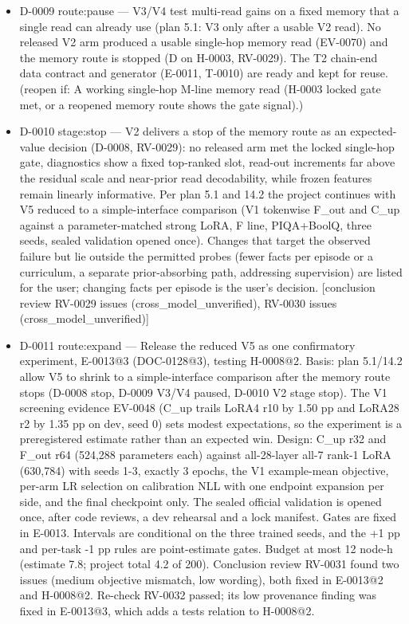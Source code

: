 \documentclass[11pt]{article}
\begin{document}
\begin{itemize}
\item D-0009 route:pause --- V3/V4 test multi-read gains on a fixed memory that a single read can already use (plan 5.1: V3 only after a usable V2 read). No released V2 arm produced a usable single-hop memory read (EV-0070) and the memory route is stopped (D on H-0003, RV-0029). The T2 chain-end data contract and generator (E-0011, T-0010) are ready and kept for reuse. (reopen if: A working single-hop M-line memory read (H-0003 locked gate met, or a reopened memory route shows the gate signal).)
\item D-0010 stage:stop --- V2 delivers a stop of the memory route as an expected-value decision (D-0008, RV-0029): no released arm met the locked single-hop gate, diagnostics show a fixed top-ranked slot, read-out increments far above the residual scale and near-prior read decodability, while frozen features remain linearly informative. Per plan 5.1 and 14.2 the project continues with V5 reduced to a simple-interface comparison (V1 tokenwise F\_out and C\_up against a parameter-matched strong LoRA, F line, PIQA+BoolQ, three seeds, sealed validation opened once). Changes that target the observed failure but lie outside the permitted probes (fewer facts per episode or a curriculum, a separate prior-absorbing path, addressing supervision) are listed for the user; changing facts per episode is the user's decision. [conclusion review RV-0029 issues (cross\_model\_unverified), RV-0030 issues (cross\_model\_unverified)]
\item D-0011 route:expand --- Release the reduced V5 as one confirmatory experiment, E-0013@3 (DOC-0128@3), testing H-0008@2. Basis: plan 5.1/14.2 allow V5 to shrink to a simple-interface comparison after the memory route stops (D-0008 stop, D-0009 V3/V4 paused, D-0010 V2 stage stop). The V1 screening evidence EV-0048 (C\_up trails LoRA4 r10 by 1.50 pp and LoRA28 r2 by 1.35 pp on dev, seed 0) sets modest expectations, so the experiment is a preregistered estimate rather than an expected win. Design: C\_up r32 and F\_out r64 (524,288 parameters each) against all-28-layer all-7 rank-1 LoRA (630,784) with seeds 1-3, exactly 3 epochs, the V1 example-mean objective, per-arm LR selection on calibration NLL with one endpoint expansion per side, and the final checkpoint only. The sealed official validation is opened once, after code reviews, a dev rehearsal and a lock manifest. Gates are fixed in E-0013. Intervals are conditional on the three trained seeds, and the +1 pp and per-task -1 pp rules are point-estimate gates. Budget at most 12 node-h (estimate 7.8; project total 4.2 of 200). Conclusion review RV-0031 found two issues (medium objective mismatch, low wording), both fixed in E-0013@2 and H-0008@2. Re-check RV-0032 passed; its low provenance finding was fixed in E-0013@3, which adds a tests relation to H-0008@2.

\end{itemize}
\end{document}
